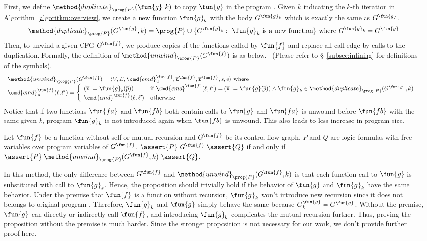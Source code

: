 
First, we define $\method{duplicate}_\prog{P}(\fun{g}, k)$ to copy $\fun{g}$ in
the program .
Given $k$ indicating the $k$-th iteration in Algorithm~\ref{algorithm:overview},
we create a new function $\fun{g}_k$ with the body $G^{\fun{g}_k}$ which is
exactly the same as $G^\fun{g}$.
\[
  \method{duplicate}_\prog{P}(G^\fun{g}, k)
    = \prog{P}\cup\{G^{\fun{g}_k}:\text{ $\fun{g}_k$ is a new function}\} \text{ where }
    G^{\fun{g}_k} = G^\fun{g}
\]
Then, to unwind a given CFG $G^\fun{f}$, we produce copies of the functions
called by $\fun{f}$ and replace all call edge by calls to the duplication.
Formally, the definition of $\method{unwind}_\prog{P}(G^\fun{f})$ is as below.
~(Please refer to \S~\ref{subsec:inlining} for definitions of the symbols).
\[
\begin{array}{l}
\method{unwind}_\prog{P}(G^\fun{f})
  = \langle V, E,\cmd{cmd}_u^\fun{f}, \overline{\texttt{u}}^\fun{f}, \overline{\texttt{r}}^\fun{f},s,e \rangle \text{ where} \\
  
\cmd{cmd}_u^\fun{f} (\ell, \ell') =
\left\{
  \begin{array}{ll}
  (\overline{\texttt{x}}:=\fun{g}_k(\overline{p})) &\text{if } 
    \cmd{cmd}^\fun{f}(\ell,\ell')=(\overline{\texttt{x}}:=\fun{g}(\overline{p}))
    \land \fun{g}_k \in \method{duplicate}_\prog{P}(G^\fun{g}, k)\\
  \cmd{cmd}^\fun{f}(\ell,\ell') &\text{otherwise}
  \end{array}
\right.
\
\end{array}
\]
Notice that if two functions $\fun{fa}$ and $\fun{fb}$ both contain calls to $\fun{g}$
and $\fun{fa}$ is unwound before $\fun{fb}$ with the same given $k$, 
program $\fun{g}_k$ is not introduced again when $\fun{fb}$ is unwound.
This also leads to less increase in program size.

\begin{proposition}
  Let $\fun{f}$ be a function without self or mutual recursion and 
  $G^\fun{f}$ be its control flow graph.
  $P$ and $Q$ are logic formulas with free variables over program variables of
  $G^\fun{f}$.
  $\assert{P}\ G^\fun{f}\ \assert{Q}$ if and only if 
  $\assert{P}\ \method{unwind}_\prog{P}(G^\fun{f}, k)\ \assert{Q}$.
\end{proposition}
In this method, the only difference between $G^\fun{f}$ and
$\method{unwind}_\prog{P}(G^\fun{f}, k)$ is that each function call to
$\fun{g}$ is substituted with call to $\fun{g}_k$.
Hence, the proposition should trivially hold if the behavior of $\fun{g}$ and
$\fun{g}_k$ have the same behavior.
Under the premise that $\fun{f}$ is a function without recursion,
$\fun{g}_k$ won't introduce new recursion since it does not belongs to original
program \prog{P}.
Therefore, $\fun{g}_k$ and $\fun{g}$ simply behave the same because 
$G^\fun{g}_k = G^\fun{g}$.
Without the premise, $\fun{g}$ can directly or indirectly call $\fun{f}$,
and introducing $\fun{g}_k$ complicates the mutual recursion further.
Thus, proving the proposition without the premise is much harder.
Since the stronger proposition is not necessary for our work,
we don't provide further proof here.

